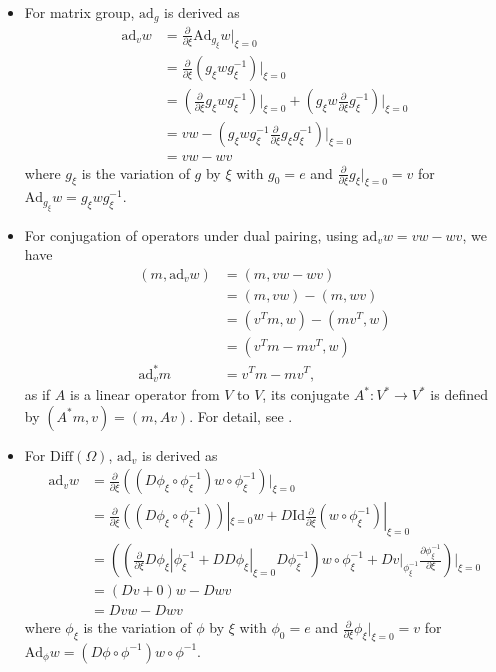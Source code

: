 \documentclass[a4paper]{article}
\theoremstyle{definition}
\theoremstyle{plain}
\begin{document}
\begin{itemize}
    \item For matrix group, $\mathrm{ad}_g$ is derived as
    \begin{align*}
        \mathrm{ad}_vw&=\frac{\partial}{\partial\xi}\mathrm{Ad}_{g_\xi}w|_{\xi=0}\\
        &=\frac{\partial}{\partial\xi}(g_\xi wg_\xi^{-1})|_{\xi=0}\\
        &=\left(\frac{\partial}{\partial\xi}g_\xi wg_\xi^{-1}\right)\bigg\rvert_{\xi=0}+\left(g_\xi w\frac{\partial}{\partial\xi}g_\xi^{-1}\right)\bigg\rvert_{\xi=0}\\
        &=vw-\left(g_\xi wg_\xi^{-1}\frac{\partial}{\partial\xi}g_\xi g_\xi^{-1}\right)\bigg\rvert_{\xi=0}\\
        &=vw-wv
    \end{align*}
    where $g_\xi$ is the variation of $g$ by $\xi$ with $g_0=e$ and $\frac{\partial}{\partial \xi}g_\xi|_{\xi=0}=v$ for $\mathrm{Ad}_{g_\xi}w=g_\xi w g^{-1}_\xi$.
    
    \item For conjugation of operators under dual pairing, using $\mathrm{ad}_vw=vw-wv$, we have
    \begin{align*}
        (m,\mathrm{ad}_vw)&=(m,vw-wv)\\
        &=(m,vw)-(m,wv)\\
        &=(v^Tm,w)-(mv^T,w)\\
        &=(v^Tm-mv^T,w)\\
        \mathrm{ad}^*_vm&=v^Tm-mv^T,
    \end{align*}
    as if $A$ is a linear operator from $V$ to $V$, its conjugate $A^*:V^*\rightarrow V^*$ is defined by $(A^*m,v)=(m,Av)$. For detail, see  \cite{singh}.
    
    \item For $\mathrm{Diff}(\Omega)$, $\mathrm{ad}_v$ is derived as
    \begin{align*}
        \mathrm{ad}_vw&=\frac{\partial}{\partial\xi}((D\phi_\xi\circ\phi^{-1}_\xi)w\circ\phi^{-1}_\xi)|_{\xi=0}\\
        &=\frac{\partial}{\partial\xi}((D\phi_\xi\circ\phi^{-1}_\xi))|_{\xi=0}w+D\mathrm{Id}\frac{\partial}{\partial\xi}(w\circ\phi^{-1}_\xi)|_{\xi=0}\\
        &=\left((\frac{\partial}{\partial\xi}D\phi_\xi|{\phi^{-1}_\xi}+DD\phi_\xi|_{\xi=0}D\phi^{-1}_\xi)w\circ\phi^{-1}_\xi+Dv|_{\phi^{-1}_\xi}\frac{\partial\phi^{-1}_\xi}{\partial\xi}\right)\bigg\rvert_{\xi=0}\\
        &=(Dv+0)w-Dwv\\
        &=Dvw-Dwv
    \end{align*}
    where $\phi_\xi$ is the variation of $\phi$ by $\xi$ with $\phi_0=e$ and $\frac{\partial}{\partial \xi}\phi_\xi|_{\xi=0}=v$ for $\mathrm{Ad}_{\phi}w=(D\phi\circ\phi^{-1})w\circ\phi^{-1}$.
\end{itemize}
\end{document}

